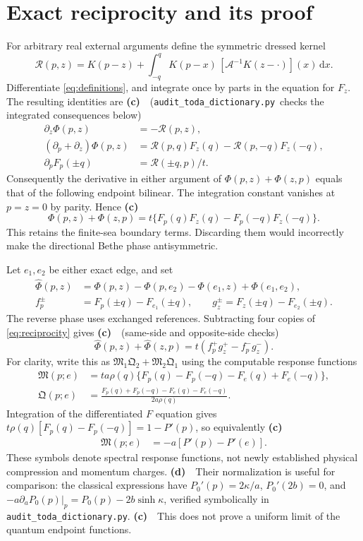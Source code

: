\documentclass[11pt,a4paper]{article}
\newcommand{\Lc}{\textbf{(c)}\ }
\newcommand{\Ld}{\textbf{(d)}\ }
\newcommand{\scr}{\texttt{audit\_\allowbreak toda\_\allowbreak dictionary.py}}
\newcommand{\dd}{\mathrm d}
\begin{document}
\section{Exact reciprocity and its proof}
For arbitrary real external arguments define the symmetric dressed kernel
\[
 \mathcal R(p,z)=K(p-z)+\int_{-q}^q
       K(p-x)\,[\mathcal A^{-1}K(z-\cdot)](x)\,\dd x.
\]
Differentiate \eqref{eq:definitions}, and integrate once by parts in the
equation for $F_z$. The resulting identities are \Lc\ (\scr\ checks the
integrated consequences below)
\begin{align}
 \partial_z\Phi(p,z)&=-\mathcal R(p,z),\\
 (\partial_p+\partial_z)\Phi(p,z)
   &=\mathcal R(p,q)F_z(q)-\mathcal R(p,-q)F_z(-q),\\
 \partial_pF_p(\pm q)&=\mathcal R(\pm q,p)/t.
\end{align}
Consequently the derivative in either argument of
$\Phi(p,z)+\Phi(z,p)$ equals that of the following endpoint bilinear.
The integration constant vanishes at $p=z=0$ by parity. Hence \Lc
\begin{equation}
 \boxed{\Phi(p,z)+\Phi(z,p)
       =t\{F_p(q)F_z(q)-F_p(-q)F_z(-q)\}.}
 \label{eq:reciprocity}
\end{equation}
This retains the finite-sea boundary terms. Discarding them would incorrectly
make the directional Bethe phase antisymmetric.

Let $e_1,e_2$ be either exact edge, and set
\begin{align}
 \widehat\Phi(p,z)&=\Phi(p,z)-\Phi(p,e_2)-\Phi(e_1,z)+\Phi(e_1,e_2),\\
 f_p^\pm&=F_p(\pm q)-F_{e_1}(\pm q),\qquad
 g_z^\pm=F_z(\pm q)-F_{e_2}(\pm q).
\end{align}
The reverse phase uses exchanged references. Subtracting four copies of
\eqref{eq:reciprocity} gives \Lc\ (same-side and opposite-side checks)
\begin{equation}
 \widehat\Phi(p,z)+\widehat\Phi(z,p)
       =t(f_p^+g_z^+-f_p^-g_z^-).
 \label{eq:four}
\end{equation}
For clarity, write this as $\mathfrak M_1\mathfrak Q_2+
\mathfrak M_2\mathfrak Q_1$ using the computable response functions
\begin{align}
 \mathfrak M(p;e)&=ta\rho(q)\{F_p(q)-F_p(-q)-F_e(q)+F_e(-q)\},\\
 \mathfrak Q(p;e)&=\frac{F_p(q)+F_p(-q)-F_e(q)-F_e(-q)}{2a\rho(q)}.
 \label{eq:responses}
\end{align}
Integration of the differentiated $F$ equation gives
$t\rho(q)[F_p(q)-F_p(-q)]=1-P'(p)$, so equivalently \Lc
\begin{align}
 \mathfrak M(p;e)&=-a[P'(p)-P'(e)].
 \label{eq:Mresponse}
\end{align}
These symbols denote spectral response functions, not newly established
physical compression and momentum charges. \Ld\ Their normalization is
useful for comparison: the classical expressions have
$P_0'(p)=2\kappa/a$, $P_0'(2b)=0$, and
$-a\partial_aP_0(p)|_p=P_0(p)-2b\sinh\kappa$, verified symbolically in
\scr. \Lc\ This does not prove a uniform limit of the quantum endpoint
functions.
\end{document}
